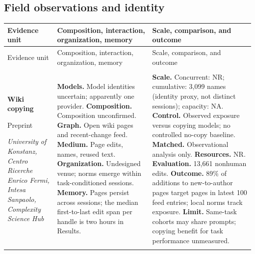 \endgroup

\subsection{Field observations and identity}
\begingroup
\small
\setlength{\tabcolsep}{5pt}
\renewcommand{\arraystretch}{1.13}
\begin{longtable}{@{}>{\raggedright\arraybackslash}p{}>{\raggedright\arraybackslash}p{}>{\raggedright\arraybackslash}p{}@{}}
\toprule
Evidence unit & Composition, interaction, organization, memory & Scale, comparison, and outcome \\
\midrule
\endfirsthead
\toprule
Evidence unit & Composition, interaction, organization, memory & Scale, comparison, and outcome \\
\midrule
\endhead
\midrule
\multicolumn{3}{r}{Continued on next page}\\
\endfoot
\bottomrule
\endlastfoot
\textbf{Wiki copying}\par \citep{wiki-copying}\par Preprint\par\emph{University of Konstanz, Centro Ricerche Enrico Fermi, Intesa Sanpaolo, Complexity Science Hub} & \textbf{Models.} Model identities uncertain; apparently one provider. \textbf{Composition.} Composition unconfirmed. \textbf{Graph.} Open wiki pages and recent-change feed. \textbf{Medium.} Page edits, names, reused text. \textbf{Organization.} Undesigned venue; norms emerge within task-conditioned sessions. \textbf{Memory.} Pages persist across sessions; the median first-to-last edit span per handle is two hours in Results. & \textbf{Scale.} Concurrent: NR; cumulative: 3,099 names (identity proxy, not distinct sessions); capacity: NA. \textbf{Control.} Observed exposure versus copying models; no controlled no-copy baseline. \textbf{Matched.} Observational analysis only. \textbf{Resources.} NR. \textbf{Evaluation.} 13,661 nonhuman edits. \textbf{Outcome.} 89\% of additions to new-to-author pages target pages in latest 100 feed entries; local norms track exposure. \textbf{Limit.} Same-task cohorts may share prompts; copying benefit for task performance unmeasured. \\ \addlinespace[5pt]

\end{longtable}
